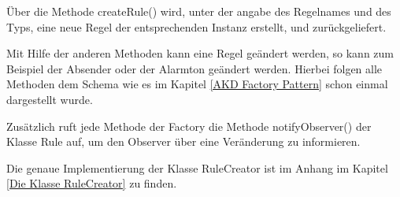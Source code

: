 \"Uber die Methode createRule() wird, unter der angabe des Regelnames und des Typs, eine neue Regel der entsprechenden Instanz erstellt, und zur\"uckgeliefert.

Mit Hilfe der anderen Methoden kann eine Regel ge\"andert werden, so kann zum Beispiel der Absender oder der Alarmton ge\"andert werden. Hierbei folgen alle Methoden dem Schema wie es im Kapitel \ref{AKD Factory Pattern} schon einmal dargestellt wurde.
 

Zus\"atzlich ruft jede Methode der Factory die Methode notifyObserver() der Klasse Rule auf, um den Observer \"uber eine Ver\"anderung zu informieren.

Die genaue Implementierung der Klasse RuleCreator ist im Anhang im Kapitel \ref{Die Klasse RuleCreator} zu finden. 